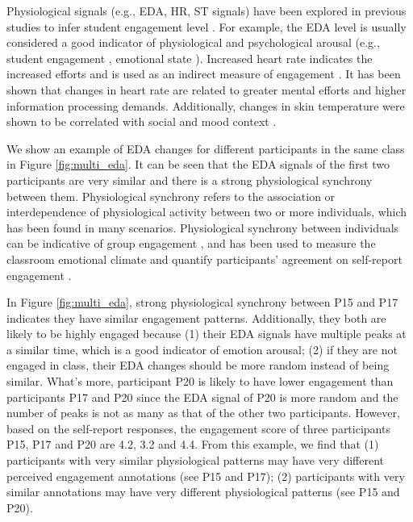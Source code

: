 \documentclass[sigconf]{acmart}
\begin{document}


Physiological signals (e.g., EDA, HR, ST signals) have been explored in previous studies to infer student engagement level \cite{gao2020n,di2018engagement}. For example, the EDA level is usually considered  a good indicator of physiological and psychological arousal (e.g., student engagement \cite{gao2020n}, emotional state \cite{di2018engagement}). Increased heart rate indicates the increased efforts and is used as an indirect measure of engagement \cite{richardson2020engagement}. It has been shown that changes in heart rate are related to greater mental efforts and higher information processing demands. Additionally, changes in skin temperature were shown to be correlated with social and mood context \cite{ioannou2014thermal}. 

We show an example of EDA changes for different participants in the same class in Figure \ref{fig:multi_eda}. It can be seen that the EDA signals of the first two participants are very similar and there is a strong physiological synchrony  \cite{palumbo2017interpersonal} between them. Physiological synchrony refers to the association or interdependence of physiological activity between two or more individuals, which has been found in many scenarios. Physiological synchrony between individuals can be indicative of group engagement \cite{palumbo2017interpersonal}, and has been used to measure the classroom emotional climate \cite{gashi2018using} and quantify participants' agreement on self-report engagement \cite{gashi2019using}. 

In Figure \ref{fig:multi_eda}, strong physiological synchrony between P15 and P17 indicates they have similar engagement patterns. Additionally, they both are likely to be highly engaged because (1) their EDA signals have multiple peaks at a similar time, which is a good indicator of emotion arousal; (2) if they are not engaged in class, their EDA changes should be more random instead of being similar. What's more, participant P20 is likely to have lower engagement than participants P17 and P20 since the EDA signal of P20 is more random and the number of peaks is not as many as that of the other two participants. However, based on the self-report responses, the engagement score of three participants P15, P17 and P20 are 4.2, 3.2 and 4.4. From this example, we find that (1) participants with very similar physiological patterns may have very different perceived engagement annotations (see P15 and P17); (2) participants with very similar annotations may have very different physiological patterns (see P15 and P20).
\end{document}
